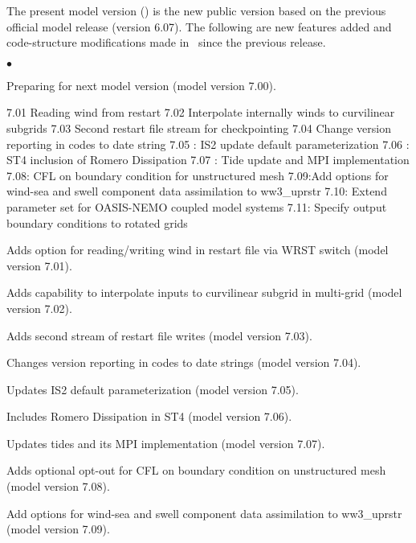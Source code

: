 \vspace{\baselineskip} 
\noindent 
The present model version (\WWver) is the new public version based on the
previous official model release (version 6.07). The following are new features added 
and code-structure modifications made in \ws\ \WWver since the previous release.

\begin{list}{$\bullet$}{\rightmargin 5mm \parsep 0mm \itemsep 0mm}

\item Preparing for next model version (model version 7.00).


7.01 Reading wind from restart
7.02 Interpolate internally winds to curvilinear subgrids
7.03 Second restart file stream for checkpointing
7.04 Change version reporting in codes to date string
7.05 : IS2 update default parameterization
7.06 : ST4 inclusion of Romero Dissipation
7.07 : Tide update and MPI implementation
7.08: CFL on boundary condition for unstructured mesh
7.09:Add options for wind-sea and swell component data assimilation to ww3_uprstr
7.10: Extend parameter set for OASIS-NEMO coupled model systems
7.11: Specify output boundary conditions to rotated grids 

\item Adds option for reading/writing wind in restart file via WRST switch (model version 7.01).

\item Adds capability to interpolate inputs to curvilinear subgrid in multi-grid  (model version 7.02).

\item Adds second stream of restart file writes (model version 7.03).

\item Changes version reporting in codes to date strings (model version 7.04).

\item Updates IS2 default parameterization (model version 7.05).

\item Includes Romero Dissipation in ST4 (model version 7.06).

\item Updates tides and its MPI implementation (model version 7.07).

\item Adds optional opt-out for CFL on boundary condition on unstructured mesh (model version 7.08).

\item Add options for wind-sea and swell component data assimilation to ww3\_uprstr (model version 7.09).


\end{list}
